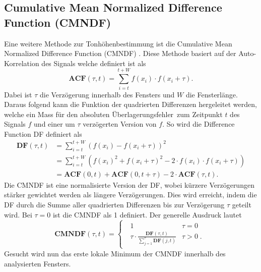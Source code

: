 \subsection{Cumulative Mean Normalized Difference Function (CMNDF)
\label{autotune:subsection:cumultativeMeanNormalizedDifferenceFunction}}
Eine weitere Methode zur Tonhöhenbestimmung ist die Cumulative Mean Normalized Difference Function (CMNDF) \cite{autotune:f0EstimationForTheElectricGuitar}.
Diese Methode basiert auf der Auto-Korrelation des Signals welche definiert ist als
\begin{equation}
    \mathbf{ACF}(\tau, t)
    =
    \sum_{i=t}^{t+W}f(x_i)\cdot f(x_i+\tau).
\end{equation}
Dabei ist $\tau$ die Verzögerung innerhalb des Fensters und $W$ die Fensterlänge.
Daraus folgend kann die Funktion der quadrierten Differenzen hergeleitet werden,
welche ein Mass für den absoluten \glqq Überlagerungsfehler\grqq\ zum Zeitpunkt $t$ des Signals $f$ und einer um $\tau$ verzögerten Version von $f$.
So wird die Difference Function DF definiert als
\begin{equation}
    \begin{aligned}
        \mathbf{DF}(\tau,t)
        &= \sum_{i=t}^{t+W}\left(f(x_i)-f(x_i+\tau)\right)^2 \\
        &= \sum_{i=t}^{t+W}\left(f(x_i)^2+f(x_i+\tau)^2-2 \cdot f(x_i) \cdot f(x_i + \tau)\right) \\
        &= \mathbf{ACF}(0,t)+\mathbf{ACF}(0,t+\tau)-2\cdot \mathbf{ACF}(\tau,t).
    \end{aligned}
\end{equation}
Die CMNDF ist eine normalisierte Version der DF,
wobei kürzere Verzögerungen stärker gewichtet werden als längere Verzögerungen.
Dies wird erreicht, indem die DF durch die Summe aller quadrierten Differenzen bis zur Verzögerung $\tau$ geteilt wird.
Bei $\tau=0$ ist die CMNDF als 1 definiert.
Der generelle Ausdruck lautet
\begin{equation}
    \mathbf{CMNDF}(\tau,t)
    =
    \begin{cases}
        \;\begin{array}{ll} 1 & \tau=0 \\
        \tau \cdot \frac{\mathbf{DF}(\tau,t)}{\sum\nolimits_{j=1}^{\tau} \mathbf{DF}(j,t)} & \tau > 0\;. \end{array}
        \end{cases}
\end{equation}
Gesucht wird nun das erste lokale Minimum der CMNDF innerhalb des analysierten Fensters.
